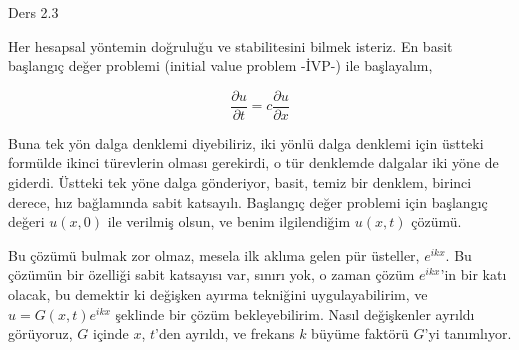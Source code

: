 \documentclass[12pt,fleqn]{article}\usepackage{../../common}
\begin{document}
Ders 2.3

Her hesapsal yöntemin doğruluğu ve stabilitesini bilmek isteriz. En basit
başlangıç değer problemi (initial value problem -İVP-) ile başlayalım,

$$
\frac{\partial u}{\partial t} =
c \frac{\partial u}{\partial x}
$$

Buna tek yön dalga denklemi diyebiliriz, iki yönlü dalga denklemi için üstteki
formülde ikinci türevlerin olması gerekirdi, o tür denklemde dalgalar iki yöne
de giderdi. Üstteki tek yöne dalga gönderiyor, basit, temiz bir denklem, birinci
derece, hız bağlamında sabit katsayılı. Başlangıç değer problemi için başlangıç
değeri $u(x,0)$ ile verilmiş olsun, ve benim ilgilendiğim $u(x,t)$ çözümü.

Bu çözümü bulmak zor olmaz, mesela ilk aklıma gelen pür üsteller, $e^{ikx}$.  Bu
çözümün bir özelliği sabit katsayısı var, sınırı yok, o zaman çözüm $e^{ikx}$'in
bir katı olacak, bu demektir ki değişken ayırma tekniğini uygulayabilirim, ve $u
= G(x,t) e^{ikx}$ şeklinde bir çözüm bekleyebilirim. Nasıl değişkenler ayrıldı
görüyoruz, $G$ içinde $x$, $t$'den ayrıldı, ve frekans $k$ büyüme faktörü $G$'yi
tanımlıyor.
\end{document}
